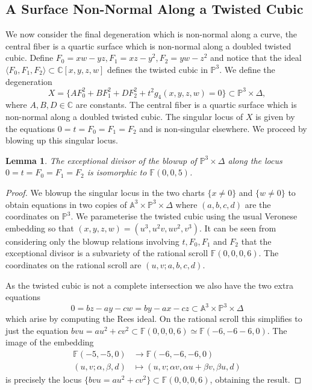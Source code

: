 \documentclass[a4paper]{amsart}
\theoremstyle{definition}
\theoremstyle{plain}
\newtheorem{lemma}[defn]{Lemma}
\theoremstyle{remark}
\newcommand{\PS}{\mathbb{P}}
\newcommand{\F}{\mathbb{F}}
\newcommand{\C}{\mathbb{C}}
\begin{document}
\subsection{A Surface Non-Normal Along a Twisted Cubic}\label{sect:non-normal along TC}
We now consider the final degeneration which is non-normal along a curve, the central fiber is a quartic surface which is non-normal along a doubled twisted cubic. Define $F_0=xw-yz, F_1=xz-y^2, F_2=yw-z^2$ and notice that the ideal $\langle F_0,F_1,F_2\rangle \subset \C[x,y,z,w]$ defines the twisted cubic in $\PS^3$. We define the degeneration
$$X =\{AF_0^2+BF_1^2+DF_2^2+t^2g_4(x,y,z,w)=0\} \subset \mathbb{P}^3 \times \Delta,$$
where $A,B,D \in \C$ are constants. The central fiber is a quartic surface which is non-normal along a doubled twisted cubic. The singular locus of $X$ is given by the equations $0=t=F_0=F_1=F_2$ and is non-singular elsewhere. We proceed by blowing up this singular locus.

\begin{lemma}\label{exceptional piece double TC}
The exceptional divisor of the blowup of $\PS^3 \times \Delta$ along the locus $0=t=F_0=F_1=F_2$ is isomorphic to $\F(0,0,5)$.
\end{lemma}

\begin{proof}
We blowup the singular locus in the two charts $\{x\neq0\}$ and $\{w \neq0\}$ to obtain equations in two copies of $\mathbb{A}^3\times \PS^3\times\Delta$ where $(a,b,c,d)$ are the coordinates on $\PS^3$. We parameterise the twisted cubic using the usual Veronese embedding so that $(x,y,z,w) = (u^3,u^2v,uv^2,v^3)$. It can be seen from considering only the blowup relations involving $t,F_0,F_1$ and $F_2$ that the exceptional divisor is a subvariety of the rational scroll $\F(0,0,0,6)$. The coordinates on the rational scroll are $(u,v;a,b,c,d)$.

As the twisted cubic is not a complete intersection we also have the two extra equations
$$0=bz-ay-cw=by-ax-cz \subset \mathbb{A}^3\times\PS^3\times\Delta$$ which arise by computing the Rees ideal. On the rational scroll this simplifies to just the equation $bvu=au^2+cv^2 \subset \F(0,0,0,6) \simeq \F(-6,-6-6,0)$. The image of the embedding
\begin{align*}
    \mathbb{F}(-5,-5,0) &\rightarrow \mathbb{F}(-6,-6,-6,0)\\
    (u,v;\alpha,\beta,d)  &\mapsto (u,v;\alpha v,\alpha u + \beta v, \beta u, d)
\end{align*}
is precisely the locus $\{bvu=au^2+cv^2\} \subset \F(0,0,0,6)$, obtaining the result.
\end{proof}
\end{document}
